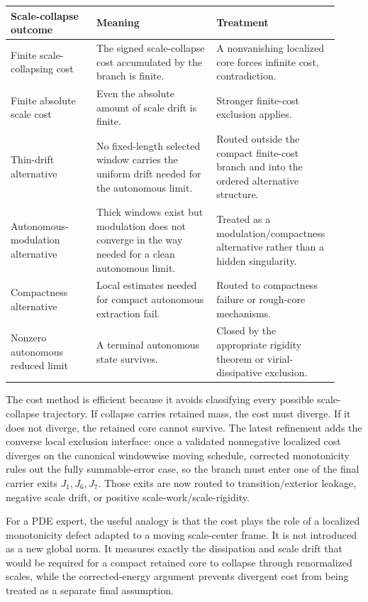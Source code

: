 \documentclass[11pt]{amsart}
\begin{document}
\begin{longtable}{@{}>{\raggedright\arraybackslash}p{0.25\linewidth}>{\raggedright\arraybackslash}p{0.35\linewidth}>{\raggedright\arraybackslash}p{0.32\linewidth}@{}}
\toprule
\textbf{Scale-collapse outcome} & \textbf{Meaning} & \textbf{Treatment} \\
\midrule
\endhead
Finite scale-collapsing cost & The signed scale-collapse cost accumulated by the branch is finite. & A nonvanishing localized core forces infinite cost, contradiction. \\
Finite absolute scale cost & Even the absolute amount of scale drift is finite. & Stronger finite-cost exclusion applies. \\
Thin-drift alternative & No fixed-length selected window carries the uniform drift needed for the autonomous limit. & Routed outside the compact finite-cost branch and into the ordered alternative structure. \\
Autonomous-modulation alternative & Thick windows exist but modulation does not converge in the way needed for a clean autonomous limit. & Treated as a modulation/compactness alternative rather than a hidden singularity. \\
Compactness alternative & Local estimates needed for compact autonomous extraction fail. & Routed to compactness failure or rough-core mechanisms. \\
Nonzero autonomous reduced limit & A terminal autonomous state survives. & Closed by the appropriate rigidity theorem or virial-dissipative exclusion. \\
\bottomrule
\end{longtable}

The cost method is efficient because it avoids classifying every possible scale-collapse trajectory.  If collapse carries retained mass, the cost must diverge.  If it does not diverge, the retained core cannot survive.  The latest refinement adds the converse local exclusion interface: once a validated nonnegative localized cost diverges on the canonical windowwise moving schedule, corrected monotonicity rules out the fully summable-error case, so the branch must enter one of the final carrier exits \(J_1,J_6,J_7\).  Those exits are now routed to transition/exterior leakage, negative scale drift, or positive scale-work/scale-rigidity.

For a PDE expert, the useful analogy is that the cost plays the role of a localized monotonicity defect adapted to a moving scale-center frame.  It is not introduced as a new global norm.  It measures exactly the dissipation and scale drift that would be required for a compact retained core to collapse through renormalized scales, while the corrected-energy argument prevents divergent cost from being treated as a separate final assumption.
\end{document}
